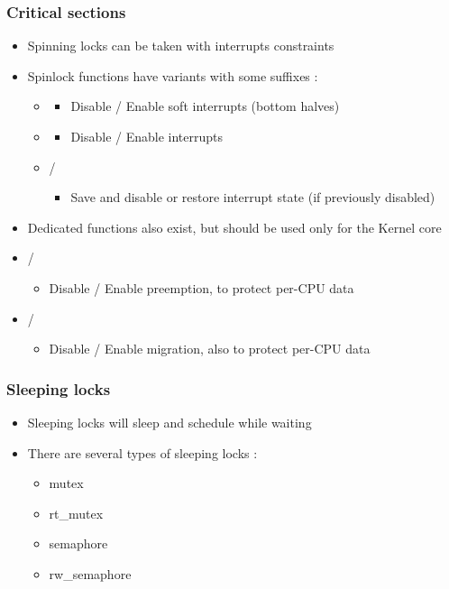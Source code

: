 \begin{frame}
	\frametitle{Critical sections}
	\begin{itemize}
		\item Spinning locks can be taken with interrupts constraints
		\item Spinlock functions have variants with some suffixes :
		\begin{itemize}
		\item {}
			\begin{itemize}
				\item Disable / Enable soft interrupts (bottom halves)
			\end{itemize}
		\item {}
			\begin{itemize}
				\item Disable / Enable interrupts
			\end{itemize}
		\item {} / 
			\begin{itemize}
				\item Save and disable or restore interrupt state (if previously disabled)
			\end{itemize}
		\end{itemize}
		\item Dedicated functions also exist, but should be used only for the Kernel core
		\item {} / 
			\begin{itemize}
				\item Disable / Enable preemption, to protect per-CPU data
			\end{itemize}
		\item {} / 
			\begin{itemize}
				\item Disable / Enable migration, also to protect per-CPU data
			\end{itemize}

	\end{itemize}
\end{frame}

\begin{frame}
  \frametitle{Sleeping locks}
	\begin{itemize}
		\item Sleeping locks will sleep and schedule while waiting
		\item There are several types of sleeping locks :
	\begin{itemize}
		\item mutex
		\item rt\_mutex
		\item semaphore
		\item rw\_semaphore
	\end{itemize}
	\end{itemize}
\end{frame}


